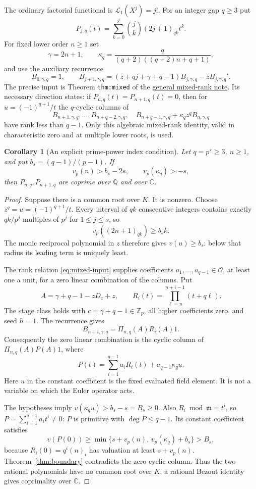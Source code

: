 \documentclass[11pt]{article}
\newtheorem{corollary}[lemma]{Corollary}
\begin{document}
The ordinary factorial functional is $\mathcal L_1(X^j)=j!$.
For an integer gap $q\ge3$ put
\[
 P_{j,q}(t)=\sum_{k=0}^j\binom jk(2j+1)_{qk}t^k .
\]
For fixed lower order $n\ge1$ set
\[
 \gamma=2n+1,\qquad
 \kappa_q=\frac{q}{(q+2)((q+2)n+q+1)},
\]
and use the auxiliary recurrence
\[
 B_{0,\gamma,q}=1,\qquad
 B_{j+1,\gamma,q}
  =(z+qj+\gamma+q-1)B_{j,\gamma,q}
       -zB_{j,\gamma,q}' .
\]
The precise input is Theorem \texttt{thm:mixed} of the
\href{LOWER_TWO_PRIME_GAP_SFC.tex}{general mixed-rank note}.
Its necessary direction states:
if $P_{n,q}(t)=P_{n+1,q}(t)=0$, then for
$u=(-1)^{q+1}/t$ the $q$-cyclic columns of
\[
 B_{n+1,\gamma,q},\ldots,B_{n+q-2,\gamma,q},\quad
 B_{n+q-1,\gamma,q}+\kappa_q z^q B_{n,\gamma,q}            \tag{4}\label{eq:mixed-input}
\]
have rank less than $q-1$.
Only this algebraic mixed-rank identity, valid in characteristic zero
and at multiple lower roots, is used.

\begin{corollary}[An explicit prime-power index condition]
\label{cor:prime-power-index}
Let $q=p^s\ge3$, $n\ge1$, and put $b_s=(q-1)/(p-1)$.
If
\[
 v_p(n)>b_s-2s,\qquad v_p(\kappa_q)>-s,                   \tag{5}\label{eq:indexcondition}
\]
then $P_{n,q},P_{n+1,q}$ are coprime over $\mathbb Q$ and
over $\mathbb C$.
\end{corollary}
\begin{proof}
Suppose there is a common root over $K$. It is nonzero.
Choose $z^q=u=(-1)^{q+1}/t$.
Every interval of $qk$ consecutive integers contains exactly
$qk/p^j$ multiples of $p^j$ for $1\le j\le s$, so
\[
 v_p((2n+1)_{qk})\ge b_sk.
\]
The monic reciprocal polynomial in $z$ therefore gives
$v(u)\ge b_s$: below that radius its leading term is uniquely least.

The rank relation \eqref{eq:mixed-input} supplies coefficients
$a_1,\ldots,a_{q-1}\in\mathcal O$, at least one a unit, for a zero
linear combination of the columns. Put
\[
 A=\gamma+q-1-zD_z+z,\qquad
 R_i(t)=\prod_{\ell=n}^{n+i-1}(t+q\ell).
\]
The stage class holds with $c=\gamma+q-1\in\mathbb Z_p$,
all higher coefficients zero, and seed $h=1$.
The recurrence gives
\[
 B_{n+i,\gamma,q}=\Pi_{n,q}(A)R_i(A)1.
\]
Consequently the zero linear combination is the cyclic column of
$\Pi_{n,q}(A)P(A)1$, where
\[
 P(t)=\sum_{i=1}^{q-1}a_iR_i(t)+a_{q-1}\kappa_q u.       \tag{6}\label{eq:relation-polynomial}
\]
Here $u$ in the constant coefficient is the fixed evaluated field
element. It is not a variable on which the Euler operator acts.

The hypotheses imply
$v(\kappa_q u)>b_s-s=B_s\ge0$.
Also $R_i\bmod\mathfrak m=t^i$, so
$\bar P=\sum_{i=1}^{q-1}\bar a_it^i\ne0$:
$P$ is primitive with $\deg\bar P\le q-1$.
Its constant coefficient satisfies
\[
 v(P(0))\ge
 \min\{s+v_p(n),\,v_p(\kappa_q)+b_s\}>B_s,
\]
because $R_i(0)=q^i(n)_i$ has valuation at least $s+v_p(n)$.
Theorem~\ref{thm:boundary} contradicts the zero cyclic column.
Thus the two rational polynomials have no common root over $K$;
a rational Bezout identity gives coprimality over $\mathbb C$.
\end{proof}
\end{document}
